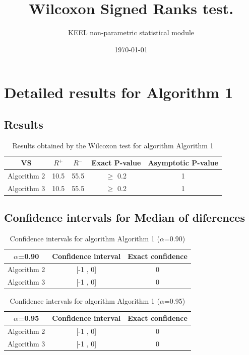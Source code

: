\documentclass[a4paper,10pt]{article}
\title{Wilcoxon Signed Ranks test.}
\date{\today}
\author{KEEL non-parametric statistical module}
\begin{document}
\pagestyle{empty}
\maketitle
\thispagestyle{empty}



\section{Detailed results for Algorithm 1}


\subsection{Results}

\begin{table}[!htp]
\centering\small
\begin{tabular}{
|c|c|c|c|c|}
\hline
 VS & $R^{+}$ & $R^{-}$ & Exact P-value & Asymptotic P-value \\ \hline 
Algorithm 2 & 10.5 & 55.5 & $\geq$ 0.2 & 1\\ \hline 
Algorithm 3 & 10.5 & 55.5 & $\geq$ 0.2 & 1\\ \hline 

\end{tabular}
\caption{Results obtained by the Wilcoxon test for algorithm Algorithm 1}
\end{table}

\subsection{Confidence intervals for Median of diferences}

\begin{table}[!htp]
\centering\small
\begin{tabular}{
|c|c|c|}
\hline
 $\alpha$=0.90 & Confidence interval & Exact confidence \\ \hline 
Algorithm 2 & [-1 , 0] & 0\\ \hline 
Algorithm 3 & [-1 , 0] & 0\\ \hline 

\end{tabular}
\caption{Confidence intervals for algorithm Algorithm 1 ($\alpha$=0.90)}
\end{table}
\begin{table}[!htp]
\centering\small
\begin{tabular}{
|c|c|c|}
\hline
 $\alpha$=0.95 & Confidence interval & Exact confidence \\ \hline 
Algorithm 2 & [-1 , 0] & 0\\ \hline 
Algorithm 3 & [-1 , 0] & 0\\ \hline 

\end{tabular}
\caption{Confidence intervals for algorithm Algorithm 1 ($\alpha$=0.95)}
\end{table}
\end{document}
